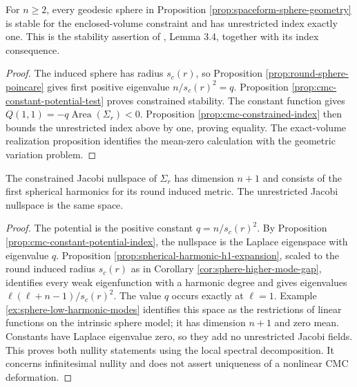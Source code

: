 \begin{theorem}\label{thm:spaceform-sphere-stability}
For $n\geq2$, every geodesic sphere in Proposition \ref{prop:spaceform-sphere-geometry} is stable for the enclosed-volume constraint and has unrestricted index exactly one. This is the stability assertion of \cite{BdCE88}, Lemma 3.4, together with its index consequence.
\end{theorem}
\begin{proof}
The induced sphere has radius $s_c(r)$, so Proposition \ref{prop:round-sphere-poincare} gives first positive eigenvalue $n/s_c(r)^2=q$. Proposition \ref{prop:cmc-constant-potential-test} proves constrained stability. The constant function gives $Q(1,1)=-q\operatorname{Area}(\Sigma_r)<0$. Proposition \ref{prop:cmc-constrained-index} then bounds the unrestricted index above by one, proving equality. The exact-volume realization proposition identifies the mean-zero calculation with the geometric variation problem.
\end{proof}

\begin{proposition}\label{prop:spaceform-sphere-nullity}
The constrained Jacobi nullspace of $\Sigma_r$ has dimension $n+1$ and consists of the first spherical harmonics for its round induced metric. The unrestricted Jacobi nullspace is the same space.
\end{proposition}
\begin{proof}
The potential is the positive constant $q=n/s_c(r)^2$. By Proposition \ref{prop:cmc-constant-potential-index}, the nullspace is the Laplace eigenspace with eigenvalue $q$. Proposition \ref{prop:spherical-harmonic-h1-expansion}, scaled to the round induced radius $s_c(r)$ as in Corollary \ref{cor:sphere-higher-mode-gap}, identifies every weak eigenfunction with a harmonic degree and gives eigenvalues $\ell(\ell+n-1)/s_c(r)^2$. The value $q$ occurs exactly at $\ell=1$. Example \ref{ex:sphere-low-harmonic-modes} identifies this space as the restrictions of linear functions on the intrinsic sphere model; it has dimension $n+1$ and zero mean. Constants have Laplace eigenvalue zero, so they add no unrestricted Jacobi fields. This proves both nullity statements using the local spectral decomposition. It concerns infinitesimal nullity and does not assert uniqueness of a nonlinear CMC deformation.
\end{proof}

